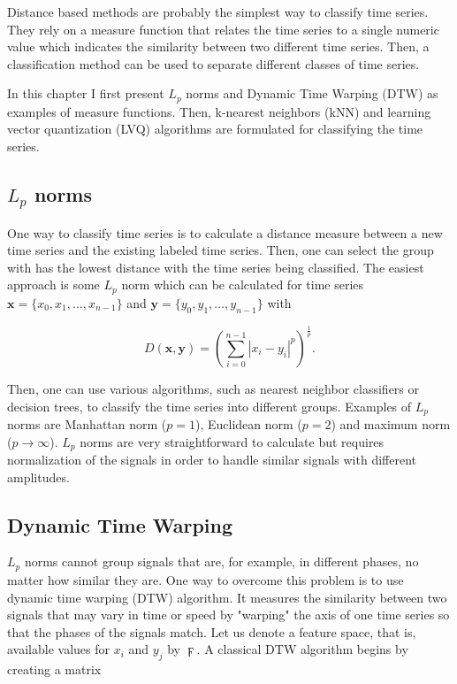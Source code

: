 Distance based methods are probably the simplest way to classify time series. They rely on a measure function that relates the time series to a single numeric value which indicates the similarity between two different time series. Then, a classification method can be used to separate different classes of time series. \cite{Xing10}

In this chapter I first present $L_p$ norms and Dynamic Time Warping (DTW) as examples of measure functions. Then, k-nearest neighbors (kNN) and learning vector quantization (LVQ) algorithms are formulated for classifying the time series.



\subsection{$L_p$ norms}
One way to classify time series is to calculate a distance measure between a new time series and the existing labeled time series. Then, one can select the group with has the lowest distance with the time series being classified. The easiest approach is some $L_p$ norm which can be calculated for time series $\mathbf{x} = \{x_0, x_1, ..., x_{n-1}\}$ and $\mathbf{y} = \{y_0, y_1, ..., y_{n-1}\}$ with \cite{smith07}

\begin{equation}
D(\mathbf{x}, \mathbf{y}) = \left( \sum_{i=0}^{n-1} \left| x_i - y_i \right|^p \right)^{\frac{1}{p}}.
\end{equation}

Then, one can use various algorithms, such as nearest neighbor classifiers or decision trees, to classify the time series into different groups. Examples of $L_p$ norms are Manhattan norm ($p = 1$), Euclidean norm ($p = 2$) and maximum norm ($p \rightarrow \infty$). $L_p$ norms are very straightforward to calculate but requires normalization of the signals in order to handle similar signals with different amplitudes. \cite{MiningTimeSeriesData} 

\subsection{Dynamic Time Warping}
$L_p$ norms cannot group signals that are, for example, in different phases, no matter how similar they are. One way to overcome this problem is to use dynamic time warping (DTW) algorithm. It measures the similarity between two signals that may vary in time or speed by "warping" the axis of one time series so that the phases of the signals match. \cite{MiningTimeSeriesData} Let us denote a feature space, that is, available values for $x_i$ and $y_j$ by $\digamma$. A classical DTW algorithm begins by creating a matrix 

